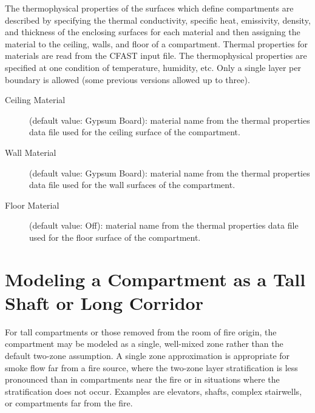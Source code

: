 The thermophysical properties of the surfaces which define compartments are described by specifying the thermal conductivity, specific heat, emissivity, density, and thickness of the enclosing surfaces for each material and then assigning the material to the ceiling, walls, and floor of a compartment.  Thermal properties for materials are read from the CFAST input file.  The thermophysical properties are specified at one condition of temperature, humidity, etc.  Only a single layer per boundary is allowed (some previous versions allowed up to three).

\begin{description}
\item[Ceiling Material] (default value: Gypsum Board): material name from the thermal properties data file used for the ceiling surface of the compartment.

\item[Wall Material] (default value: Gypsum Board): material name from the thermal properties data file used for the wall surfaces of the compartment.

\item[Floor Material] (default value: Off): material name from the thermal properties data file used for the floor surface of the compartment.
    \end{description}



\section{Modeling a Compartment as a Tall Shaft or Long Corridor}

For tall compartments or those removed from the room of fire origin, the compartment may be modeled as a single, well-mixed zone rather than the default two-zone assumption. A single zone approximation is appropriate for smoke flow far from a fire source, where the two-zone layer stratification is less pronounced than in compartments near the fire or in situations where the stratification does not occur. Examples are elevators, shafts, complex stairwells, or compartments far from the fire.

